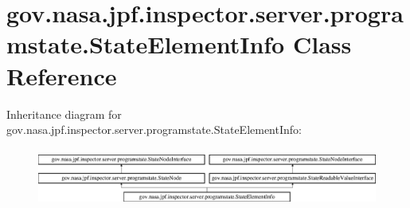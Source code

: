 \hypertarget{classgov_1_1nasa_1_1jpf_1_1inspector_1_1server_1_1programstate_1_1_state_element_info}{}\section{gov.\+nasa.\+jpf.\+inspector.\+server.\+programstate.\+State\+Element\+Info Class Reference}
\label{classgov_1_1nasa_1_1jpf_1_1inspector_1_1server_1_1programstate_1_1_state_element_info}
Inheritance diagram for gov.\+nasa.\+jpf.\+inspector.\+server.\+programstate.\+State\+Element\+Info\+:\begin{figure}[H]
\begin{center}
\leavevmode
\includegraphics[height=1.944444cm]{classgov_1_1nasa_1_1jpf_1_1inspector_1_1server_1_1programstate_1_1_state_element_info}
\end{center}
\end{figure}
